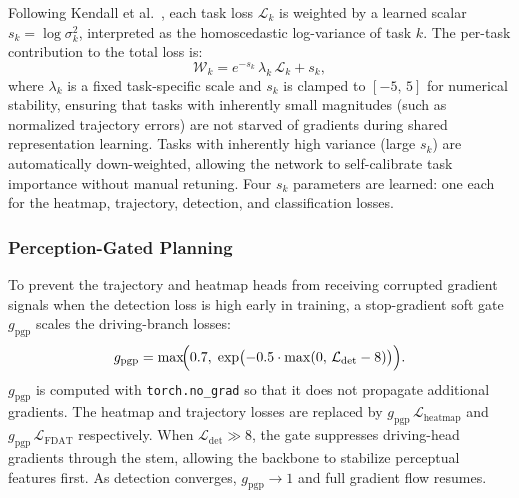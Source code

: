 Following Kendall et al.~\cite{b_kendall}, each task loss
$\mathcal{L}_k$ is weighted by a learned scalar
$s_k = \log\sigma_k^2$, interpreted as the homoscedastic
log-variance of task $k$.
The per-task contribution to the total loss is:
\begin{equation}
  \mathcal{W}_k = e^{-s_k}\,\lambda_k\,\mathcal{L}_k + s_k,
  \label{eq:uncertainty}
\end{equation}
where $\lambda_k$ is a fixed task-specific scale and $s_k$ is
clamped to $[-5,\,5]$ for numerical stability, ensuring that tasks with inherently small magnitudes (such as normalized trajectory errors) are not starved of gradients during shared representation learning.
Tasks with inherently high variance (large $s_k$) are
automatically down-weighted, allowing the network to
self-calibrate task importance without manual retuning.
Four $s_k$ parameters are learned: one each for the heatmap,
trajectory, detection, and classification losses.

\subsubsection{Perception-Gated Planning}

To prevent the trajectory and heatmap heads from receiving
corrupted gradient signals when the detection loss is high early
in training, a stop-gradient soft gate $g_{\mathrm{pgp}}$ scales
the driving-branch losses:
\begin{equation}
  g_{\mathrm{pgp}}
    = \max\!\Bigl(0.7,\;
        \exp\bigl(-0.5\cdot
          \max(0,\,\mathcal{L}_{\mathrm{det}} - 8)\bigr)
      \Bigr).
  \label{eq:pgp}
\end{equation}
$g_{\mathrm{pgp}}$ is computed with \texttt{torch.no\_grad}
so that it does not propagate additional gradients.
The heatmap and trajectory losses are replaced by
$g_{\mathrm{pgp}}\,\mathcal{L}_{\mathrm{heatmap}}$ and
$g_{\mathrm{pgp}}\,\mathcal{L}_{\mathrm{FDAT}}$ respectively.
When $\mathcal{L}_{\mathrm{det}}\!\gg\!8$, the gate suppresses
driving-head gradients through the stem, allowing the backbone to
stabilize perceptual features first.
As detection converges, $g_{\mathrm{pgp}}\!\to\!1$ and full
gradient flow resumes.
